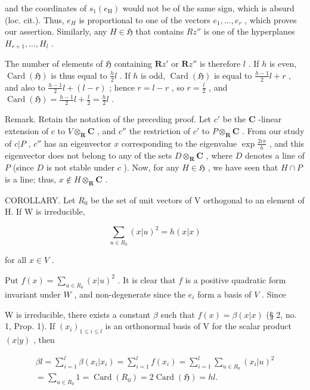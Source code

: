 and the coordinates of \(s_{1}(e_{\mathrm{H}})\) would not be of the same sign, which is absurd (loc. cit.). Thus, \(e_{H}\) is proportional to one of the vectors \(e_{1},\ldots,e_{r}\) , which proves our assertion. Similarly, any \(H\in \mathfrak{H}\) that contains \(Rz''\) is one of the hyperplanes \(H_{r+1},\ldots,H_{l}\) .

The number of elements of \(\mathfrak{H}\) containing \(\mathbf{R}z'\) or \(\mathbf{R}z''\) is therefore \(l\) . If \(h\) is even, \(\operatorname{Card}(\mathfrak{H})\) is thus equal to \(\frac{h}{2} l\) . If \(h\) is odd, \(\operatorname{Card}(\mathfrak{H})\) is equal to \(\frac{h - 1}{2} l + r\) , and also to \(\frac{h - 1}{2} l + (l - r)\) ; hence \(r = l - r\) , so \(r = \frac{l}{2}\) , and \(\operatorname{Card}(\mathfrak{H}) = \frac{h - 1}{2} l + \frac{l}{2} = \frac{h}{2} l\) .

Remark. Retain the notation of the preceding proof. Let \(c'\) be the \(\mathbf{C}\) -linear extension of \(c\) to \(V \otimes_{\mathbf{R}} \mathbf{C}\) , and \(c''\) the restriction of \(c'\) to \(P \otimes_{\mathbf{R}} \mathbf{C}\) . From our study of \(c|P\) , \(c''\) has an eigenvector \(x\) corresponding to the eigenvalue \(\exp \frac{2i\pi}{h}\) , and this eigenvector does not belong to any of the sets \(D \otimes_{\mathbf{R}} \mathbf{C}\) , where \(D\) denotes a line of \(P\) (since \(D\) is not stable under \(c\) ). Now, for any \(H \in \mathfrak{H}\) , we have seen that \(H \cap P\) is a line; thus, \(x \notin H \otimes_{\mathbf{R}} \mathbf{C}\) .

COROLLARY. Let \(R_{0}\) be the set of unit vectors of V orthogonal to an element of H. If W is irreducible,

\[
\sum_ {u \in R _ {0}} (x | u) ^ {2} = h (x | x)\tag{4}
\]

for all \(x \in V\) .

Put \(f(x) = \sum_{u \in R_0} (x|u)^2\) . It is clear that \(f\) is a positive quadratic form invariant under \(W\) , and non-degenerate since the \(e_i\) form a basis of \(V\) . Since

W is irreducible, there exists a constant \(\beta\) such that \(f(x) = \beta (x|x)\) (§ 2, no. 1, Prop. 1). If \((x_{i})_{1\leqslant i\leqslant l}\) is an orthonormal basis of V for the scalar product \((x|y)\) , then

\[
\begin{array}{l} \beta l = \sum_ {i = 1} ^ {l} \beta (x _ {i} | x _ {i}) = \sum_ {i = 1} ^ {l} f (x _ {i}) = \sum_ {i = 1} ^ {l} \sum_ {u \in R _ {0}} (x _ {i} | u) ^ {2} \\ = \sum_ {u \in R _ {0}} 1 = \operatorname{Card} (R _ {0}) = 2 \operatorname{Card} (\mathfrak {H}) = h l. \end{array}
\]

